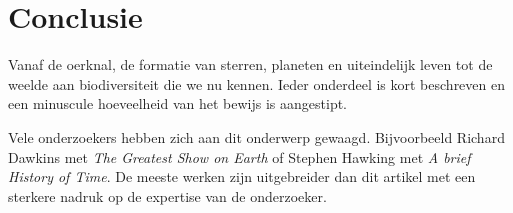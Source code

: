 \documentclass{article}
\begin{document}
    \section{Conclusie}
        Vanaf de oerknal, de formatie van sterren, planeten en uiteindelijk leven tot de weelde aan biodiversiteit die we nu kennen. Ieder onderdeel is kort beschreven en een minuscule hoeveelheid van het bewijs is aangestipt. 
        
        Vele onderzoekers hebben zich aan dit onderwerp gewaagd. Bijvoorbeeld Richard Dawkins met \emph{The Greatest Show on Earth} of Stephen Hawking met \emph{A brief History of Time}. De meeste werken zijn uitgebreider dan dit artikel met een sterkere nadruk op de expertise van de onderzoeker.
        
      
\end{document}
